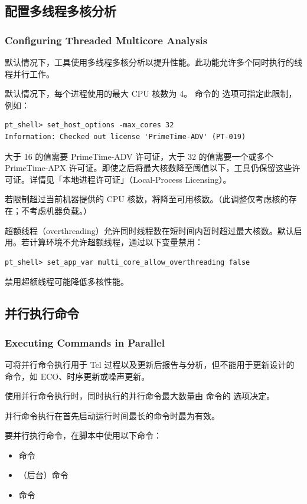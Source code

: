 \subsection{配置多线程多核分析}
\subsubsection*{Configuring Threaded Multicore Analysis}

默认情况下，工具使用多线程多核分析以提升性能。此功能允许多个同时执行的线程并行工作。

默认情况下，每个进程使用的最大 CPU 核数为 4。 命令的  选项可指定此限制，例如：
\begin{lstlisting}
pt_shell> set_host_options -max_cores 32
Information: Checked out license 'PrimeTime-ADV' (PT-019)
\end{lstlisting}

大于 16 的值需要 PrimeTime-ADV 许可证，大于 32 的值需要一个或多个 PrimeTime-APX 许可证。即使之后将最大核数降至阈值以下，工具仍保留这些许可证。详情见「本地进程许可证」（Local-Process Licensing）。

若限制超过当前机器提供的 CPU 核数，将降至可用核数。（此调整仅考虑核的存在；不考虑机器负载。）

超额线程（overthreading）允许同时线程数在短时间内暂时超过最大核数。默认启用。若计算环境不允许超额线程，通过以下变量禁用：
\begin{lstlisting}
pt_shell> set_app_var multi_core_allow_overthreading false
\end{lstlisting}
禁用超额线程可能降低多核性能。

\subsection{并行执行命令}
\subsubsection*{Executing Commands in Parallel}

可将并行命令执行用于 Tcl 过程以及更新后报告与分析，但不能用于更新设计的命令，如 ECO、时序更新或噪声更新。

使用并行命令执行时，同时执行的并行命令最大数量由  命令的  选项决定。

并行命令执行在首先启动运行时间最长的命令时最为有效。

要并行执行命令，在脚本中使用以下命令：
\begin{itemize}
  \item {} 命令
  \item {}（后台）命令
  \item {} 命令
\end{itemize}

